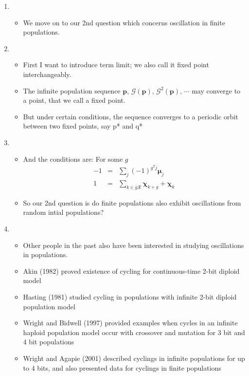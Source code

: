 \documentclass{article}
\begin{document}
\begin{enumerate}
    
\item 
  \begin{itemize}
  \item We move on to our 2nd question which concerns oscillation in
    finite populations.
  \end{itemize}
    
\item
  \begin{itemize}
  \item First I want to introduce term limit; we also call it fixed
    point interchangeably.
  \item The infinite population sequence  $\bm{p}, \, \mathcal{G}(\bm{p}), \, {\mathcal{G}}^2(\bm{p}), \, \cdots$ may
    converge to a point, that we call a fixed point.
  \item But under certain conditions, the sequence converges to a
    periodic orbit between two fixed points, say p* and q*
\end{itemize}

\item
  \begin{itemize}
  \item And the conditions are: For some $g$
  \begin{eqnarray*}
      -1 &=& \sum \limits_{j} (-1)^{g^T j} \bm{\mu}_j \\
      1 &=& \sum \limits_{k \in \bar{g}\mathcal{R}} \bm{\chi}_{k+g} + \bm{\chi}_k 
      \end{eqnarray*}
  \item So our 2nd question is do finite populations also exhibit
     oscillations from random intial populations?
  \end{itemize}
    
\item
  \begin{itemize}
  \item Other people in the past also have been interested in studying
    oscillations in populations.
   \item Akin (1982) proved existence of cycling for continuous-time
     2-bit diploid model
  \item Hasting (1981) studied cycling in populations with infinite
    2-bit diploid population model
  \item Wright and Bidwell (1997) provided examples when cycles in an
    infinite haploid population model occur with crossover and
    mutation for 3 bit and 4 bit populations
  \item Wright and Agapie (2001) described cyclings in infinite
    populations for up to 4 bits, and also presented data for cyclings
    in finite populations
  \end{itemize}


\end{enumerate}
\end{document}
